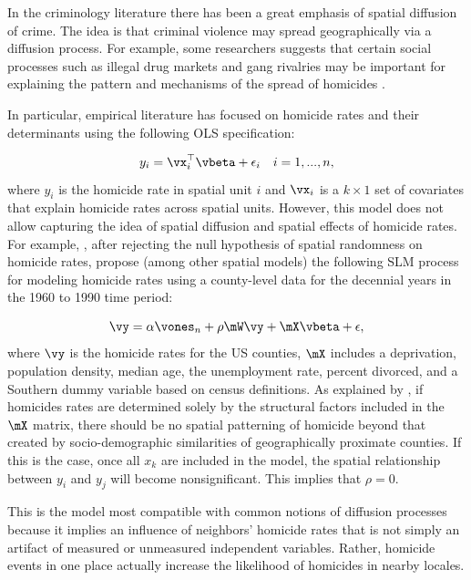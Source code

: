 \documentclass[english,12pt]{book}\usepackage[]{graphicx}\usepackage[]{xcolor}
\begin{document}
\begin{example}
In the criminology literature there has been a great emphasis of spatial diffusion of crime. The idea is that criminal violence may spread geographically via a diffusion process. For example, some researchers suggests that certain social processes such as illegal drug markets and gang rivalries may be important for explaining the pattern and mechanisms of the spread of homicides \citep{cohen1999diffusion}. 

In particular, empirical literature has focused on homicide rates and their determinants using the following OLS specification:

\begin{equation*}
y_i = \vx_i^\top\vbeta + \epsilon_i\quad i = 1, ..., n,
\end{equation*}
%
where $y_i$ is the homicide rate in spatial unit $i$ and $\vx_i$ is a $k\times 1$ set of covariates that explain homicide rates across spatial units. However, this model does not allow capturing the idea of spatial diffusion and spatial effects of homicide rates. For example, \cite{baller2001structural}, after rejecting the null hypothesis of spatial randomness on homicide rates, propose (among other spatial models) the following SLM process for modeling homicide rates using a county-level data for the decennial years in the 1960 to 1990 time period:

\begin{equation*}
\vy  =  \alpha \vones_n + \rho \mW\vy + \mX\vbeta + \epsilon,
\end{equation*}
%
where $\vy$ is the homicide rates for the US counties, $\mX$ includes a deprivation, population density, median age, the unemployment rate, percent divorced, and a Southern dummy variable based on census definitions.  As explained by \cite{baller2001structural}, if homicides rates are determined solely by the structural factors included in the $\mX$ matrix, there should be no spatial patterning of homicide beyond that created by socio-demographic similarities of geographically proximate counties. If this is the case, once all $x_k$ are included in the model, the spatial relationship between $y_i$ and $y_j$ will become nonsignificant. This implies that $\rho = 0$.

This is the model most compatible with common notions of diffusion processes because it implies an influence of neighbors' homicide rates that is not simply an artifact of measured or unmeasured independent variables. Rather, homicide events in one place actually increase the likelihood of homicides in nearby locales. 
\end{example}
\end{document}

